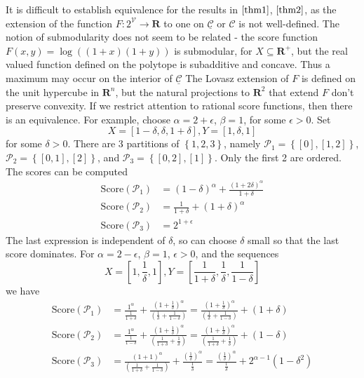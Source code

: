 \documentclass{article}
\theoremstyle{case}
\begin{document}
It is difficult to establish equivalence for the results in $\ref{thm1}$, $\ref{thm2}$, as the extension of the function $F \colon 2^\mathcal{V} \rightarrow \mathbf{R}$ to one on $\underline{\mathcal{C}}$ or $\mathcal{C}$ is not well-defined. The notion of submodularity does not seem to be related - the score function $F(x,y) = \log((1+x)(1+y))$ is submodular, for $X \subseteq \mathbf{R}^+$, but the real valued function defined on the polytope is subadditive and concave. Thus a maximum may occur on the interior of $\underline{\mathcal{C}}$ The Lovasz extension of $F$ is defined on the unit hypercube in $\mathbf{R}^n$, but the natural projections to $\mathbf{R}^2$ that extend $F$ don't preserve convexity. If we restrict attention to rational score functions, then there is an equivalence. For example,  choose $\alpha = 2 + \epsilon$, $\beta = 1$, for some $\epsilon > 0$. Set
\[
X = \left[ 1-\delta, \delta, 1 + \delta\right], Y = \left[ 1, \delta, 1\right]
\] 
for some $\delta > 0$. There are 3 partitions of $\left\lbrace 1, 2, 3\right\rbrace$, namely $\mathcal{P}_1 = \left\lbrace \left[ 0 \right], \left[ 1, 2\right]\right\rbrace$, $\mathcal{P}_2 = \left\lbrace \left[ 0, 1 \right], \left[ 2\right]\right\rbrace$, and $\mathcal{P}_3 = \left\lbrace \left[ 0, 2 \right], \left[ 1 \right]\right\rbrace$. Only the first 2 are ordered. The scores can be computed
\begin{align*}
\text{Score}\left(\mathcal{P}_1\right) & = \left( 1-\delta \right)^\alpha + \frac{\left( 1+2\delta\right)^\alpha}{1+\delta} \\
\text{Score}\left(\mathcal{P}_2\right) & = \frac{1}{1+\delta} + \left( 1+\delta\right)^\alpha \\
\text{Score}\left(\mathcal{P}_3\right) & = 2^{1+\epsilon}
\end{align*}
The last expression is independent of $\delta$, so can choose $\delta$ small so that the last score dominates.
For $\alpha = 2 - \epsilon$, $\beta = 1$, $\epsilon > 0$, and the sequences
\[
X = \left[ 1, \frac{1}{\delta}, 1\right], Y = \left[ \frac{1}{1+\delta}, \frac{1}{\delta}, \frac{1}{1-\delta}\right]
\] 
we have
\begin{align*}
\text{Score}\left(\mathcal{P}_1\right) & = \frac{1^\alpha}{\frac{1}{1+\delta}} + \frac{\left(1 + \frac{1}{\delta}\right)^\alpha}{\left( \frac{1}{\delta} + \frac{1}{1 - \delta}\right) }  = \frac{\left(1 + \frac{1}{\delta}\right)^\alpha}{\left( \frac{1}{\delta} + \frac{1}{1 - \delta}\right) } + \left( 1 + \delta \right)\\
\text{Score}\left(\mathcal{P}_2\right) & = \frac{1^\alpha}{\frac{1}{1-\delta}} + \frac{\left( 1 + \frac{1}{\delta}\right)^\alpha}{\left( \frac{1}{1+\delta} + \frac{1}{\delta}\right)}  = \frac{\left( 1 + \frac{1}{\delta}\right)^\alpha}{\left( \frac{1}{1+\delta} + \frac{1}{\delta}\right)} + \left( 1 - \delta \right)\\
\text{Score}\left(\mathcal{P}_3\right) & = \frac{\left( 1 + 1\right)^\alpha}{\left(\frac{1}{1+\delta} + \frac{1}{1-\delta}\right)}  + \frac{\left( \frac{1}{\delta}\right)^\alpha}{\frac{1}{\delta}} = \frac{\left( \frac{1}{\delta}\right)^\alpha}{\frac{1}{\delta}} + 2^{\alpha - 1}\left( 1 - \delta^2\right) 
\end{align*}
\end{document}
